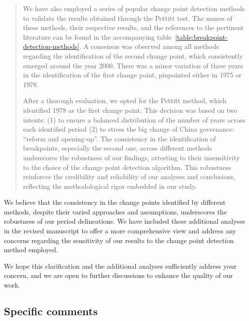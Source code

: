 \begin{quote}
	We have also employed a series of popular change point detection methods to validate the results obtained through the Pettitt test. The names of these methods, their respective results, and the references to the pertinent literature can be found in the accompanying table~\ref{table:breakpoint-detection-methods}. A consensus was observed among all methods regarding the identification of the second change point, which consistently emerged around the year 2000. There was a minor variation of three years in the identification of the first change point, pinpointed either in 1975 or 1978.

	After a thorough evaluation, we opted for the Pettitt method, which identified 1978 as the first change point. This decision was based on two intents: (1) to ensure a balanced distribution of the number of years across each identified period (2) to stress the big change of China governance: ``reform and opening-up''. The consistency in the identification of breakpoints, especially the second one, across different methods underscores the robustness of our findings, attesting to their insensitivity to the choice of the change point detection algorithm. This robustness reinforces the credibility and reliability of our analyses and conclusions, reflecting the methodological rigor embedded in our study.
\end{quote}

\AR*{} We believe that the consistency in the change points identified by different methods, despite their varied approaches and assumptions, underscores the robustness of our period delineations. We have included these additional analyses in the revised manuscript to offer a more comprehensive view and address any concerns regarding the sensitivity of our results to the change point detection method employed.

\AR*{} We hope this clarification and the additional analyses sufficiently address your concern, and we are open to further discussions to enhance the quality of our work.

\subsection*{Specific comments}

